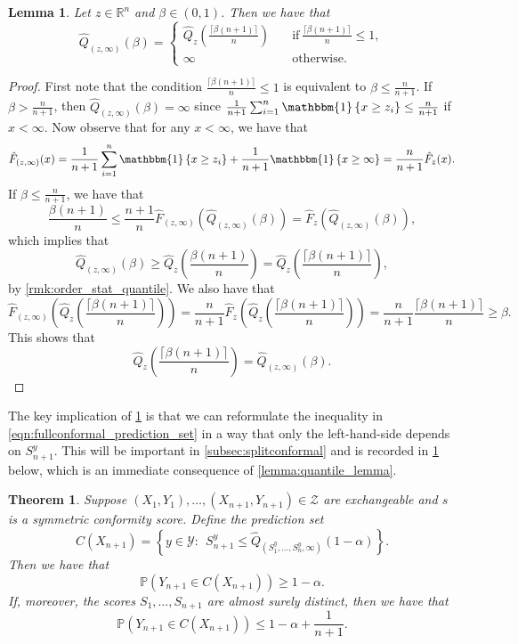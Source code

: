 \documentclass[11pt, titlepage]{article} %
\newcommand{\R}{\mathrm}
\newcommand{\Prob}[1]{\mathbb{P}\left( #1 \right)}
\newcommand{\Ind}[1]{\mathbbm{1}\left\{ #1 \right\}}
\numberwithin{equation}{section}
\newtheorem{theorem}{Theorem}
\newtheorem{lemma}{Lemma}
\theoremstyle{definition}
\numberwithin{theorem}{section}
\numberwithin{lemma}{section}
\numberwithin{corollary}{section}
\numberwithin{proposition}{section}
\numberwithin{definition}{section}
\numberwithin{remark}{section}
\begin{document}
\begin{lemma}
    Let \(z \in \mathbb{R}^n\) and \(\beta \in (0,1)\). Then we have that \[\hat{Q}_{(z,\infty)} (\beta) = \begin{cases}
        \hat{Q}_z\left( \frac{\lceil \beta (n+1) \rceil }{n} \right) \quad &\R{if} \ \frac{\lceil \beta(n+1) \rceil}{n} \leq 1, \\
        \infty \quad &\R{otherwise}.
        \end{cases}\]
\label{lemma:quantile_lemma_extra}
\end{lemma}
\begin{proof}
    First note that the condition \(\frac{\lceil \beta(n+1) \rceil}{n} \leq 1\) is equivalent to \(\beta \leq \frac{n}{n+1}\). If \(\beta > \frac{n}{n+1}\), then \(\hat{Q}_{(z, \infty)}(\beta) = \infty\) since \(\frac{1}{n+1}\sum_{i=1}^n \Ind{x \geq z_i} \leq \frac{n}{n+1}\) if \(x < \infty\). Now observe that for any \(x < \infty\), we have that \[\hat{F}_{(z, \infty)}(x) = \frac{1}{n+1} \sum_{i=1}^{n}\Ind{x \geq z_i} + \frac{1}{n+1}\Ind{x \geq \infty} = \frac{n}{n+1} \hat{F}_z(x).\] If \(\beta \leq \frac{n}{n+1}\), we have that \[\frac{\beta(n+1)}{n} \leq \frac{n+1}{n}  \hat{F}_{(z,\infty)}(\hat{Q}_{(z,\infty)}(\beta)) = \hat{F}_{z}(\hat{Q}_{(z,\infty)}(\beta)),\] which implies that \[\hat{Q}_{(z,\infty)}(\beta) \geq \hat{Q}_{z}\left(\frac{\beta(n+1)}{n}\right) = \hat{Q}_z\left( \frac{\lceil \beta (n+1) \rceil }{n} \right), \] by \cref{rmk:order_stat_quantile}. We also have that \[\hat{F}_{(z, \infty)}\left( \hat{Q}_z\left( \frac{\lceil \beta (n+1) \rceil }{n} \right) \right) = \frac{n}{n+1} \hat{F}_{z}\left( \hat{Q}_z\left( \frac{\lceil \beta (n+1) \rceil }{n} \right) \right) = \frac{n}{n+1}\frac{\lceil \beta (n+1) \rceil }{n} \geq \beta. \] This shows that \[\hat{Q}_z\left( \frac{\lceil \beta (n+1) \rceil }{n} \right) = \hat{Q}_{(z, \infty)}(\beta).\]
\end{proof}

\noindent
The key implication of \cref{lemma:quantile_lemma_extra} is that we can reformulate the inequality in \eqref{eqn:fullconformal_prediction_set} in a way that only the left-hand-side depends on \(S_{n+1}^y\). This will be important in \cref{subsec:splitconformal} and is recorded in \cref{thm:fullconformal_coverage_v2} below, which is an immediate consequence of \cref{lemma:quantile_lemma}.

\begin{theorem}
    Suppose \((X_1, Y_1), \ldots, (X_{n+1}, Y_{n+1}) \in \mathcal{Z}\) are exchangeable and \(s\) is a symmetric conformity score. Define the prediction set \[
        C(X_{n+1}) = \left\{ y \in \mathcal{Y}: \ \ S_{n+1}^y \leq \hat{Q}_{(S_1^y, \ldots, S_n^y, \infty)}(1-\alpha)  \right\}.
    \] Then we have that \[\Prob{Y_{n+1} \in C(X_{n+1})} \geq 1-\alpha.\] If, moreover, the scores \(S_1, \ldots, S_{n+1}\) are almost surely distinct, then we have that \[\Prob{Y_{n+1} \in C(X_{n+1})} \leq 1-\alpha + \frac{1}{n+1}.\]

\label{thm:fullconformal_coverage_v2}  
\end{theorem}
\end{document}
